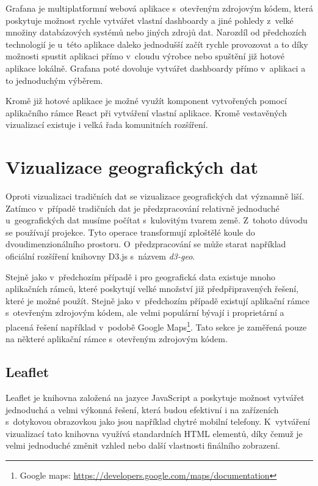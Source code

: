 Grafana je multiplatformní webová aplikace s~otevřeným zdrojovým kódem, která poskytuje možnost rychle vytvářet vlastní dashboardy a jiné pohledy z~velké množiny databázových systémů nebo jiných zdrojů dat. Narozdíl od předchozích technologií je u~této aplikace daleko jednodušší začít rychle provozovat a to díky možnosti spustit aplikaci přímo v~cloudu výrobce nebo spuštění již hotové aplikace lokálně. Grafana poté dovoluje vytvářet dashboardy přímo v~aplikaci a to jednoduchým výběrem.

Kromě již hotové aplikace je možné využít komponent vytvořených pomocí aplikačního rámce React při vytváření vlastní aplikace. Kromě vestavěných vizualizací existuje i velká řada komunitních rozšíření. 

\section{Vizualizace geografických dat}
Oproti vizualizaci tradičních dat se vizualizace geografických dat významně liší. Zatímco v~případě tradičních dat je předzpracování relativně jednoduché u~geografických dat musíme počítat s~kulovitým tvarem země. Z~tohoto důvodu se používají projekce. Tyto operace transformují zploštělé koule do dvoudimenzionálního prostoru. O~předzpracování se může starat například oficiální rozšíření knihovny D3.js s~názvem \textit{d3-geo}.

Stejně jako v~předchozím případě i pro geografická data existuje mnoho aplikačních rámců, které poskytují velké množství již předpřipravených řešení, které je možné použít. Stejně jako v~předchozím případě existují aplikační rámce s~otevřeným zdrojovým kódem, ale velmi populární bývají i proprietární a placená řešení například v~podobě Google Maps\footnote{Google maps: \url{https://developers.google.com/maps/documentation}}. Tato sekce je zaměřená pouze na některé aplikační rámce s~otevřeným zdrojovým kódem.

\subsection*{Leaflet}
Leaflet je knihovna založená na jazyce JavaScript a poskytuje možnost vytvářet jednoduchá a velmi výkonná řešení, která budou efektivní i na zařízeních s~dotykovou obrazovkou jako jsou například chytré mobilní telefony. K~vytváření vizualizací tato knihovna využívá standardních HTML elementů, díky čemuž je velmi jednoduché změnit vzhled nebo další vlastnosti finálního zobrazení.

